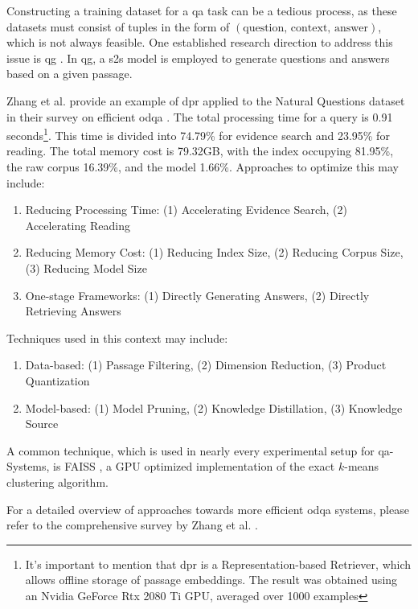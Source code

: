 Constructing a training dataset for a \gls{qa} task can be a tedious process, as these datasets must consist of tuples in the form of $(\text{question, context, answer})$, which is not always feasible. One established research direction to address this issue is \gls{qg} \cite{serban_generating_2016}. In \gls{qg}, a \gls{s2s} model is employed to generate questions and answers based on a given passage.

Zhang et al. provide an example of \gls{dpr} applied to the Natural Questions dataset in their survey on efficient \gls{odqa} \cite{zhang_survey_2023}. The total processing time for a query is 0.91 seconds\footnote{It's important to mention that \gls{dpr} is a Representation-based Retriever, which allows offline storage of passage embeddings. The result was obtained using an Nvidia GeForce Rtx 2080 Ti GPU, averaged over 1000 examples}. This time is divided into 74.79\% for evidence search and 23.95\% for reading. The total memory cost is 79.32GB, with the index occupying 81.95\%, the raw corpus 16.39\%, and the model 1.66\%. Approaches to optimize this may include:

\begin{enumerate}
    \item Reducing Processing Time: (1) Accelerating Evidence Search, (2) Accelerating Reading
    \item Reducing Memory Cost: (1) Reducing Index Size, (2) Reducing Corpus Size, (3) Reducing Model Size
    \item One-stage Frameworks: (1) Directly Generating Answers, (2) Directly Retrieving Answers
\end{enumerate}

Techniques used in this context may include:

\begin{enumerate}
    \item Data-based: (1) Passage Filtering, (2) Dimension Reduction, (3) Product Quantization
    \item Model-based: (1) Model Pruning, (2) Knowledge Distillation, (3) Knowledge Source 
\end{enumerate}

A common technique, which is used in nearly every experimental setup for \gls{qa}-Systems, is FAISS \cite{johnson_billion-scale_2017}, a GPU optimized implementation of the exact $k$-means clustering algorithm.

For a detailed overview of approaches towards more efficient \gls{odqa} systems, please refer to the comprehensive survey by Zhang et al. \cite{zhang_survey_2023}.

